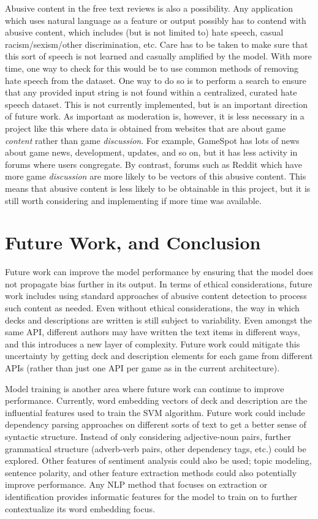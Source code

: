 \documentclass[10pt,twocolumn]{article}
\begin{document}
Abusive content in the free text reviews is also a possibility. Any application which uses natural language as a feature or output possibly has to contend with abusive content, which includes (but is not limited to) hate speech, casual racism/sexism/other discrimination, etc. Care has to be taken to make sure that this sort of speech is not learned and casually amplified by the model. With more time, one way to check for this would be to use common methods of removing hate speech from the dataset. One way to do so is to perform a search to ensure that any provided input string is not found within a centralized, curated hate speech dataset. \cite{Mathew} This is not currently implemented, but is an important direction of future work. As important as moderation is, however, it is less necessary in a project like this where data is obtained from websites that are about game \textit{content} rather than game \textit{discussion}. For example, GameSpot has lots of news about game news, development, updates, and so on, but it has less activity in forums where users congregate. By contrast, forums such as Reddit which have more game \textit{discussion} are more likely to be vectors of this abusive content. This means that abusive content is less likely to be obtainable in this project, but it is still worth considering and implementing if more time was available.

\section{Future Work, and Conclusion}

Future work can improve the model performance by ensuring that the model does not propagate bias further in its output. In terms of ethical considerations, future work includes using standard approaches of abusive content detection \cite{Mathew} to process such content as needed. Even without ethical considerations, the way in which decks and descriptions are written is still subject to variability. Even amongst the same API, different authors may have written the text items in different ways, and this introduces a new layer of complexity. Future work could mitigate this uncertainty by getting deck and description elements for each game from different APIs (rather than just one API per game as in the current architecture). 

Model training is another area where future work can continue to improve performance. Currently, word embedding vectors of deck and description are the influential features used to train the SVM algorithm. Future work could include dependency parsing approaches on different sorts of text to get a better sense of syntactic structure. \cite{LDiCaro} Instead of only considering adjective-noun pairs, further grammatical structure (adverb-verb pairs, other dependency tags, etc.) could be explored. Other features of sentiment analysis could also be used; topic modeling, sentence polarity, and other feature extraction methods could also potentially improve performance. \cite{Ramzan, Ryan_51} Any NLP method that focuses on extraction or identification provides informatic features for the model to train on to further contextualize its word embedding focus.
\end{document}
